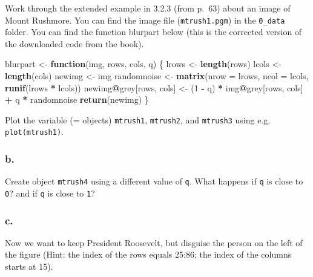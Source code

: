 \documentclass[]{article}
\newenvironment{Shaded}{\begin{snugshade}}{\end{snugshade}}
\newcommand{\ControlFlowTok}[1]{\textcolor[rgb]{0.13,0.29,0.53}{\textbf{#1}}}
\newcommand{\DataTypeTok}[1]{\textcolor[rgb]{0.13,0.29,0.53}{#1}}
\newcommand{\DecValTok}[1]{\textcolor[rgb]{0.00,0.00,0.81}{#1}}
\newcommand{\KeywordTok}[1]{\textcolor[rgb]{0.13,0.29,0.53}{\textbf{#1}}}
\newcommand{\NormalTok}[1]{#1}
\newcommand{\OperatorTok}[1]{\textcolor[rgb]{0.81,0.36,0.00}{\textbf{#1}}}
\newcommand{\StringTok}[1]{\textcolor[rgb]{0.31,0.60,0.02}{#1}}
\begin{document}
Work through the extended example in 3.2.3 (from p.~63) about an image
of Mount Rushmore. You can find the image file (\texttt{mtrush1.pgm}) in
the \texttt{0\_data} folder. You can find the function blurpart below
(this is the corrected version of the downloaded code from the book).

\begin{Shaded}
\begin{Highlighting}[]
\NormalTok{blurpart <-}\StringTok{ }\ControlFlowTok{function}\NormalTok{(img, rows, cols, q) \{}
\NormalTok{  lrows <-}\StringTok{ }\KeywordTok{length}\NormalTok{(rows)}
\NormalTok{  lcols <-}\StringTok{ }\KeywordTok{length}\NormalTok{(cols)}
\NormalTok{  newimg <-}\StringTok{ }\NormalTok{img}
\NormalTok{  randomnoise <-}\StringTok{ }\KeywordTok{matrix}\NormalTok{(}\DataTypeTok{nrow =}\NormalTok{ lrows, }\DataTypeTok{ncol =}\NormalTok{ lcols, }\KeywordTok{runif}\NormalTok{(lrows }\OperatorTok{*}\StringTok{ }\NormalTok{lcols))}
\NormalTok{  newimg}\OperatorTok{@}\NormalTok{grey[rows, cols] <-}\StringTok{ }\NormalTok{(}\DecValTok{1} \OperatorTok{-}\StringTok{ }\NormalTok{q) }\OperatorTok{*}\StringTok{ }\NormalTok{img}\OperatorTok{@}\NormalTok{grey[rows, cols] }\OperatorTok{+}\StringTok{ }\NormalTok{q }\OperatorTok{*}\StringTok{ }\NormalTok{randomnoise}
  \KeywordTok{return}\NormalTok{(newimg)}
\NormalTok{\}}
\end{Highlighting}
\end{Shaded}

Plot the variable (= objects) \texttt{mtrush1}, \texttt{mtrush2}, and
\texttt{mtrush3} using e.g. \texttt{plot(mtrush1)}.

\hypertarget{b.-3}{%
\subsubsection{b.}\label{b.-3}}

Create object \texttt{mtrush4} using a different value of \texttt{q}.
What happens if \texttt{q} is close to \texttt{0}? and if \texttt{q} is
close to \texttt{1}?

\hypertarget{c.-3}{%
\subsubsection{c.}\label{c.-3}}

Now we want to keep President Roosevelt, but disguise the person on the
left of the figure (Hint: the index of the rows equals 25:86; the index
of the columns starts at 15).
\end{document}
